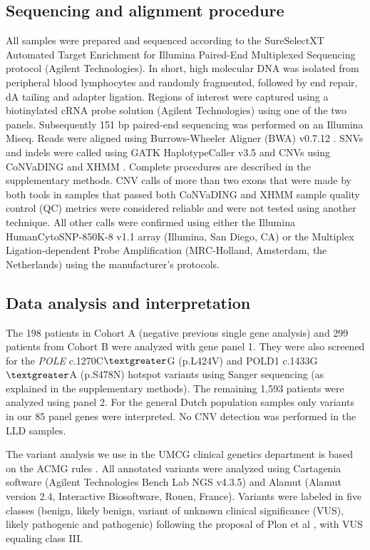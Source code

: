 \subsection{Sequencing and alignment procedure}
All samples were prepared and sequenced according to the SureSelectXT Automated Target Enrichment for Illumina Paired-End Multiplexed Sequencing protocol (Agilent Technologies). 
In short, high molecular DNA was isolated from peripheral blood lymphocytes and randomly fragmented, followed by end repair, dA tailing and adapter ligation. 
Regions of interest were captured using a biotinylated cRNA probe solution (Agilent Technologies) using one of the two panels. Subsequently 151 bp paired-end sequencing was performed on an Illumina Miseq. 
Reads were aligned using Burrows-Wheeler Aligner (BWA) v0.7.12 \cite{Li_2010}. 
SNVs and indels were called using GATK HaplotypeCaller v3.5 and CNVs using CoNVaDING \cite{Johansson_2016b} and XHMM \cite{Fromer_2012}. 
Complete procedures are described in the supplementary methods. 
CNV calls of more than two exons that were made by both tools in samples that passed both CoNVaDING and XHMM sample quality control (QC) metrics were considered reliable and were not tested using another technique. 
All other calls were confirmed using either the Illumina HumanCytoSNP-850K-8 v1.1 array (Illumina, San Diego, CA) or the Multiplex Ligation-dependent Probe Amplification (MRC-Holland, Amsterdam, the Netherlands) using the manufacturer’s protocols. 

\subsection{Data analysis and interpretation}
The 198 patients in Cohort A (negative previous single gene analysis) and 299 patients from Cohort B were analyzed with gene panel 1. 
They were also screened for the \textsl{POLE} c.1270C$\textgreater$G (p.L424V) and POLD1 c.1433G$\textgreater$A (p.S478N) hotspot variants \cite{Palles_2012} using Sanger sequencing (as explained in the supplementary methods). 
The remaining 1,593 patients were analyzed using panel 2. 
For the general Dutch population samples only variants in our 85 panel genes were interpreted. 
No CNV detection was performed in the LLD samples.

The variant analysis we use in the UMCG clinical genetics department is based on the ACMG rules \cite{Richards_2015}. 
All annotated variants were analyzed using Cartagenia software (Agilent Technologies Bench Lab NGS v4.3.5) and Alamut (Alamut version 2.4, Interactive Biosoftware, Rouen, France). 
Variants were labeled in five classes (benign, likely benign, variant of unknown clinical significance (VUS), likely pathogenic and pathogenic) following the proposal of Plon et al \cite{Plon_2008}, with VUS equaling class III.

